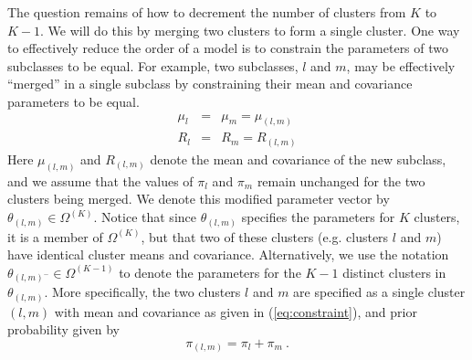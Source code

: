 \documentclass[12pt]{article}
\begin{document}
The question remains of how to decrement the number of clusters
from $K$ to $K-1$. 
We will do this by merging two clusters to form a single cluster.
One way to effectively reduce the order 
of a model is to constrain the parameters
of two subclasses to be equal.
For example, two subclasses, $l$ and $m$, may be effectively
``merged'' in a single subclass by constraining their mean and covariance
parameters to be equal.
\begin{eqnarray}
\label{eq:constraint}
\mu_l &=&  \mu_m = \mu_{(l,m)} \\
\nonumber
R_l &=&  R_m = R_{(l,m)} 
\end{eqnarray}
Here $\mu_{(l,m)}$ and $R_{(l,m)}$ denote the mean and covariance
of the new subclass,
and we assume that the values of $\pi_l$ and $\pi_m$ remain unchanged
for the two clusters being merged.
We denote this modified parameter vector by $\theta_{(l,m)} \in \Omega^{(K)}$.
Notice that since 
$\theta_{(l,m)}$ specifies the parameters for $K$ clusters,
it is a member of $\Omega^{(K)}$, 
but that two of these clusters (e.g. clusters $l$ and $m$)
have identical cluster means and covariance.
Alternatively, we use the notation $\theta_{(l,m)^-} \in \Omega^{(K-1)}$
to denote the parameters for the $K-1$ distinct clusters
in $\theta_{(l,m)}$.
More specifically, the two clusters $l$ and $m$ are specified
as a single cluster $(l,m)$ with mean and covariance 
as given in (\ref{eq:constraint}), and
prior probability given by
\begin{equation}
\pi_{(l,m)} = \pi_l+\pi_m \ .
\label{eq:newprior}
\end{equation}
\end{document}
